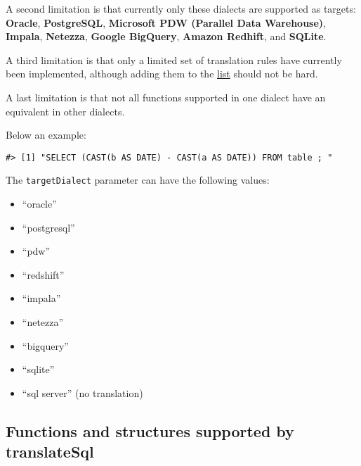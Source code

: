 \documentclass[]{article}
\newenvironment{Shaded}{\begin{snugshade}}{\end{snugshade}}
\newcommand{\DataTypeTok}[1]{\textcolor[rgb]{0.13,0.29,0.53}{#1}}
\newcommand{\KeywordTok}[1]{\textcolor[rgb]{0.13,0.29,0.53}{\textbf{#1}}}
\newcommand{\NormalTok}[1]{#1}
\newcommand{\OperatorTok}[1]{\textcolor[rgb]{0.81,0.36,0.00}{\textbf{#1}}}
\newcommand{\StringTok}[1]{\textcolor[rgb]{0.31,0.60,0.02}{#1}}
\providecommand{\tightlist}{%
  \setlength{\itemsep}{0pt}\setlength{\parskip}{0pt}}
\begin{document}
A second limitation is that currently only these dialects are supported
as targets: \textbf{Oracle}, \textbf{PostgreSQL}, \textbf{Microsoft PDW
(Parallel Data Warehouse)}, \textbf{Impala}, \textbf{Netezza},
\textbf{Google BigQuery}, \textbf{Amazon Redhift}, and \textbf{SQLite}.

A third limitation is that only a limited set of translation rules have
currently been implemented, although adding them to the
\href{https://github.com/OHDSI/SqlRender/blob/master/inst/csv/replacementPatterns.csv}{list}
should not be hard.

A last limitation is that not all functions supported in one dialect
have an equivalent in other dialects.

Below an example:

\begin{Shaded}
\end{Shaded}

\begin{verbatim}
#> [1] "SELECT (CAST(b AS DATE) - CAST(a AS DATE)) FROM table ; "
\end{verbatim}

The \texttt{targetDialect} parameter can have the following values:

\begin{itemize}
\tightlist
\item
  ``oracle''
\item
  ``postgresql''
\item
  ``pdw''
\item
  ``redshift''
\item
  ``impala''
\item
  ``netezza''
\item
  ``bigquery''
\item
  ``sqlite''
\item
  ``sql server'' (no translation)
\end{itemize}

\hypertarget{functions-and-structures-supported-by-translatesql}{%
\subsection{Functions and structures supported by
translateSql}\label{functions-and-structures-supported-by-translatesql}}
\end{document}

